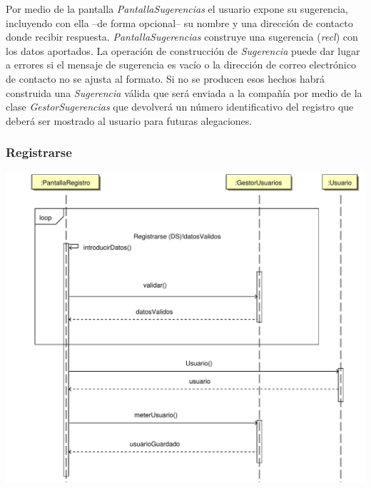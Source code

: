 \documentclass[11pt, a4paper, twoside, titlepage]{article}
\begin{document}
				Por medio de la pantalla {\itshape PantallaSugerencias} el usuario expone su sugerencia, incluyendo con ella --de forma opcional-- su nombre y una dirección de contacto donde recibir respuesta. {\itshape PantallaSugerencias} construye una sugerencia ({\itshape recl}) con los datos aportados. La operación de construcción de {\itshape Sugerencia} puede dar lugar a errores si el mensaje de sugerencia es vacío o la dirección de correo electrónico de contacto no se ajusta al formato. Si no se producen esos hechos habrá construida una {\itshape Sugerencia} válida que será enviada a la compañía por medio de la clase {\itshape GestorSugerencias} que devolverá un número identificativo del registro que deberá ser mostrado al usuario para futuras alegaciones.

			\subsubsection{Registrarse}
				\begin{center}
					\includegraphics[scale=.5]{diseno/diagramas/registrarse.pdf}
				\end{center}
\end{document}
